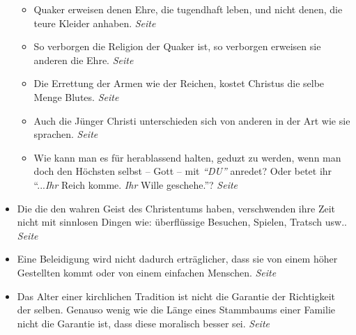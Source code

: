 \begin{itemize}
\begin{itemize}
 \item Quaker erweisen denen Ehre, die tugendhaft leben, und nicht denen, die
teure Kleider anhaben.
 \dotfill \textit{Seite~\pageref{ref:09_36_ehre_erweisen}}\\

 \item So verborgen die Religion der Quaker ist, so verborgen erweisen sie
anderen die Ehre.
 \dotfill \textit{Seite~\pageref{ref:09_37_ehre_erweisen}}\\

 \item Die Errettung der Armen wie der Reichen, kostet Christus die selbe Menge
Blutes.
 \dotfill \textit{Seite~\pageref{ref:09_39_erettung}}\\

 \item Auch die Jünger Christi unterschieden sich von anderen in der Art wie sie
sprachen.
 \dotfill \textit{Seite~\pageref{ref:10_08_sprache}}\\

 \item Wie kann man es für herablassend halten, geduzt zu werden, wenn man doch
den Höchsten selbst -- Gott -- mit \textit{"`DU"'} anredet? Oder betet ihr
"`...\textit{Ihr} Reich komme. \textit{Ihr} Wille geschehe."'?
 \dotfill \textit{Seite~\pageref{ref:10_08_duzen}}\\

 \end{itemize}

 \item Die die den wahren Geist des Christentums haben, verschwenden ihre Zeit
nicht mit sinnlosen Dingen wie: überflüssige Besuchen, Spielen, Tratsch usw..
 \dotfill \textit{Seite~\pageref{ref:10_08_zeitvertreib}}\\

 \item Eine Beleidigung wird nicht dadurch erträglicher, dass sie von einem
höher Gestellten kommt oder von einem einfachen Menschen.
 \dotfill \textit{Seite~\pageref{ref:11_03_beleidigung}}\\

 \item Das Alter einer kirchlichen Tradition ist nicht die Garantie der
Richtigkeit der selben. Genauso wenig wie die Länge eines Stammbaums einer
Familie nicht die Garantie ist, dass diese moralisch besser sei.
 \dotfill \textit{Seite~\pageref{ref:11_04_abstammung}}\\


\end{itemize}
